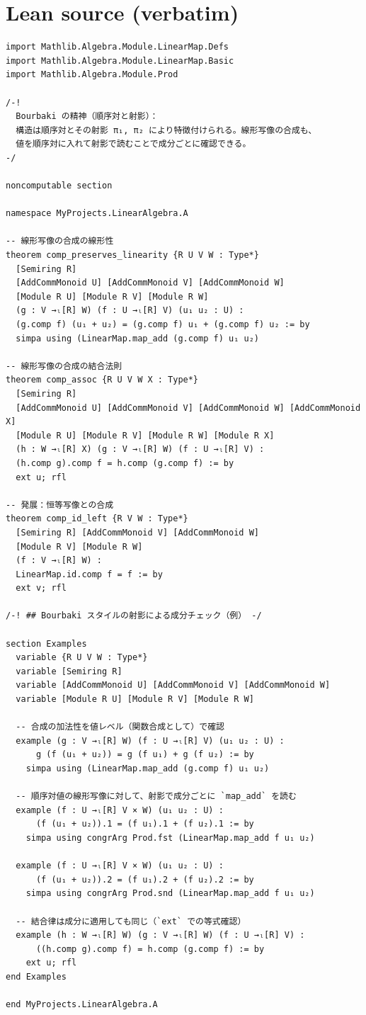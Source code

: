 \documentclass[12pt]{article}
\begin{document}
\section*{Lean source (verbatim)}
\begin{lstlisting}
import Mathlib.Algebra.Module.LinearMap.Defs
import Mathlib.Algebra.Module.LinearMap.Basic
import Mathlib.Algebra.Module.Prod

/-!
  Bourbaki の精神（順序対と射影）：
  構造は順序対とその射影 π₁, π₂ により特徴付けられる。線形写像の合成も、
  値を順序対に入れて射影で読むことで成分ごとに確認できる。
-/

noncomputable section

namespace MyProjects.LinearAlgebra.A

-- 線形写像の合成の線形性
theorem comp_preserves_linearity {R U V W : Type*}
  [Semiring R]
  [AddCommMonoid U] [AddCommMonoid V] [AddCommMonoid W]
  [Module R U] [Module R V] [Module R W]
  (g : V →ₗ[R] W) (f : U →ₗ[R] V) (u₁ u₂ : U) :
  (g.comp f) (u₁ + u₂) = (g.comp f) u₁ + (g.comp f) u₂ := by
  simpa using (LinearMap.map_add (g.comp f) u₁ u₂)

-- 線形写像の合成の結合法則
theorem comp_assoc {R U V W X : Type*}
  [Semiring R]
  [AddCommMonoid U] [AddCommMonoid V] [AddCommMonoid W] [AddCommMonoid X]
  [Module R U] [Module R V] [Module R W] [Module R X]
  (h : W →ₗ[R] X) (g : V →ₗ[R] W) (f : U →ₗ[R] V) :
  (h.comp g).comp f = h.comp (g.comp f) := by
  ext u; rfl

-- 発展：恒等写像との合成
theorem comp_id_left {R V W : Type*}
  [Semiring R] [AddCommMonoid V] [AddCommMonoid W]
  [Module R V] [Module R W]
  (f : V →ₗ[R] W) :
  LinearMap.id.comp f = f := by
  ext v; rfl

/-! ## Bourbaki スタイルの射影による成分チェック（例） -/

section Examples
  variable {R U V W : Type*}
  variable [Semiring R]
  variable [AddCommMonoid U] [AddCommMonoid V] [AddCommMonoid W]
  variable [Module R U] [Module R V] [Module R W]

  -- 合成の加法性を値レベル（関数合成として）で確認
  example (g : V →ₗ[R] W) (f : U →ₗ[R] V) (u₁ u₂ : U) :
      g (f (u₁ + u₂)) = g (f u₁) + g (f u₂) := by
    simpa using (LinearMap.map_add (g.comp f) u₁ u₂)

  -- 順序対値の線形写像に対して、射影で成分ごとに `map_add` を読む
  example (f : U →ₗ[R] V × W) (u₁ u₂ : U) :
      (f (u₁ + u₂)).1 = (f u₁).1 + (f u₂).1 := by
    simpa using congrArg Prod.fst (LinearMap.map_add f u₁ u₂)

  example (f : U →ₗ[R] V × W) (u₁ u₂ : U) :
      (f (u₁ + u₂)).2 = (f u₁).2 + (f u₂).2 := by
    simpa using congrArg Prod.snd (LinearMap.map_add f u₁ u₂)

  -- 結合律は成分に適用しても同じ（`ext` での等式確認）
  example (h : W →ₗ[R] W) (g : V →ₗ[R] W) (f : U →ₗ[R] V) :
      ((h.comp g).comp f) = h.comp (g.comp f) := by
    ext u; rfl
end Examples

end MyProjects.LinearAlgebra.A

\end{lstlisting}
\end{document}
